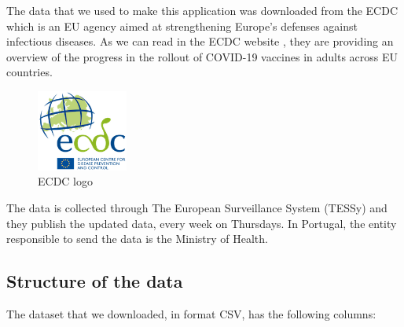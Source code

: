 The data that we used to make this application was downloaded from the \ac{ECDC} which is an \ac{EU} agency aimed at strengthening Europe's defenses against infectious diseases.
As we can read in the \ac{ECDC} website \cite{dataDownload}, they are providing an overview of the progress in the rollout of COVID-19 vaccines in adults across \ac{EU} countries.
\begin{figure}[h]
\centering %
\includegraphics[width=3cm]{images/ecdc.png} 

\caption{ECDC logo}
\label{figura:qualquernome}
\end{figure}

The data is collected through The European Surveillance System (TESSy) and they publish the updated data, every week on Thursdays. In Portugal, the entity responsible to send the data is the Ministry of Health.

\subsection{Structure of the data}
The dataset that we downloaded, in format CSV, has the following columns:

